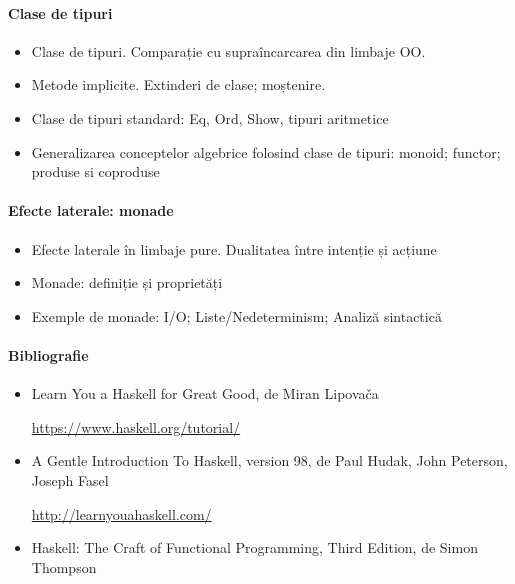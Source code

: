 \documentclass[romanian]{article}
\begin{document}
\paragraph{Clase de tipuri}
\begin{itemize}
\item Clase de tipuri.  Comparație cu supraîncarcarea din limbaje OO.
\item Metode implicite. Extinderi de clase; moștenire. 
\item Clase de tipuri standard: Eq, Ord, Show, tipuri aritmetice 
\item Generalizarea conceptelor algebrice folosind clase de tipuri: monoid; functor; produse si coproduse
\end{itemize} 
\paragraph{Efecte laterale: monade}
\begin{itemize}
\item Efecte laterale în limbaje pure. Dualitatea între intenție și acțiune
\item Monade: definiție și proprietăți
\item Exemple de monade: I/O; Liste/Nedeterminism; Analiză sintactică
\end{itemize}

\vfill
\paragraph{Bibliografie}
\begin{itemize}
\item  Learn You a Haskell for Great Good, de Miran Lipova\v{c}a

\url{https://www.haskell.org/tutorial/}
\item A Gentle Introduction To Haskell, version 98, de Paul Hudak, John Peterson, 
 Joseph Fasel
 
 \url{http://learnyouahaskell.com/}
 \item Haskell: The Craft of Functional Programming, Third Edition, de Simon Thompson
\end{itemize}
\end{document}
